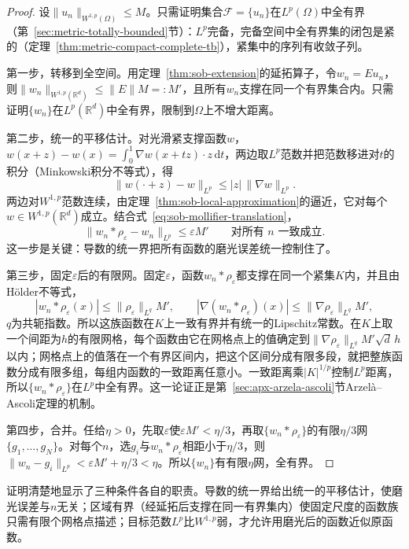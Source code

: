 \begin{proof}
设$\|u_n\|_{W^{1,p}(\Omega)}\le M$。只需证明集合$\mathcal F=\{u_n\}$在$L^p(\Omega)$中全有界（第~\ref{sec:metric-totally-bounded}节）：$L^p$完备，完备空间中全有界集的闭包是紧的（定理~\ref{thm:metric-compact-complete-tb}），紧集中的序列有收敛子列。

第一步，转移到全空间。用定理~\ref{thm:sob-extension}的延拓算子，令$w_n=Eu_n$，则$\|w_n\|_{W^{1,p}(\mathbb R^d)}\le\|E\|M=:M'$，且所有$w_n$支撑在同一个有界集合内。只需证明$\{w_n\}$在$L^p(\mathbb R^d)$中全有界，限制到$\Omega$上不增大距离。

第二步，统一的平移估计。对光滑紧支撑函数$w$，$w(x+z)-w(x)=\int_0^1\nabla w(x+tz)\cdot z\,\mathrm dt$，两边取$L^p$范数并把范数移进对$t$的积分（Minkowski积分不等式），得
\[
 \|w(\cdot+z)-w\|_{L^p}\le|z|\,\|\nabla w\|_{L^p} .
\]
两边对$W^{1,p}$范数连续，由定理~\ref{thm:sob-local-approximation}的逼近，它对每个$w\in W^{1,p}(\mathbb R^d)$成立。结合式~\eqref{eq:sob-mollifier-translation}，
\[
 \|w_n*\rho_\varepsilon-w_n\|_{L^p}\le\varepsilon M'\qquad\text{对所有 }n\text{ 一致成立}.
\]
这一步是关键：导数的统一界把所有函数的磨光误差统一控制住了。

第三步，固定$\varepsilon$后的有限网。固定$\varepsilon$，函数$w_n*\rho_\varepsilon$都支撑在同一个紧集$K$内，并且由Hölder不等式，
\[
 |w_n*\rho_\varepsilon(x)|\le\|\rho_\varepsilon\|_{L^q}M',\qquad|\nabla(w_n*\rho_\varepsilon)(x)|\le\|\nabla\rho_\varepsilon\|_{L^q}M' ,
\]
$q$为共轭指数。所以这族函数在$K$上一致有界并有统一的Lipschitz常数。在$K$上取一个间距为$h$的有限网格，每个函数由它在网格点上的值确定到$\|\nabla\rho_\varepsilon\|_{L^q}M'\sqrt d\,h$以内；网格点上的值落在一个有界区间内，把这个区间分成有限多段，就把整族函数分成有限多组，每组内函数的一致距离任意小。一致距离乘$|K|^{1/p}$控制$L^p$距离，所以$\{w_n*\rho_\varepsilon\}$在$L^p$中全有界。这一论证正是第~\ref{sec:apx-arzela-ascoli}节Arzelà--Ascoli定理的机制。

第四步，合并。任给$\eta>0$，先取$\varepsilon$使$\varepsilon M'<\eta/3$，再取$\{w_n*\rho_\varepsilon\}$的有限$\eta/3$网$\{g_1,\ldots,g_N\}$。对每个$n$，选$g_i$与$w_n*\rho_\varepsilon$相距小于$\eta/3$，则$\|w_n-g_i\|_{L^p}<\varepsilon M'+\eta/3<\eta$。所以$\{w_n\}$有有限$\eta$网，全有界。
\end{proof}

证明清楚地显示了三种条件各自的职责。导数的统一界给出统一的平移估计，使磨光误差与$n$无关；区域有界（经延拓后支撑在同一有界集内）使固定尺度的函数族只需有限个网格点描述；目标范数$L^p$比$W^{1,p}$弱，才允许用磨光后的函数近似原函数。

